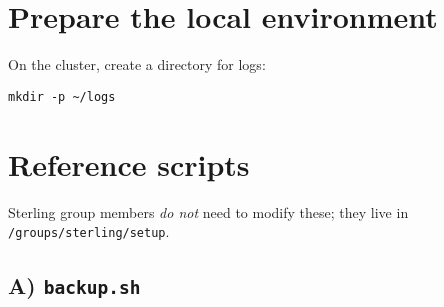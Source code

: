 \documentclass[12pt,letterpaper]{article}
\begin{document}
\section{Prepare the local environment}
\label{sec:prepare}
On the cluster, create a directory for logs:
\begin{lstlisting}[style=custombash]
mkdir -p ~/logs
\end{lstlisting}

\section{Reference scripts}
\label{sec:reference-scripts}
Sterling group members \emph{do not} need to modify these; they live in
\verb|/groups/sterling/setup|.

\subsection{A) \texttt{backup.sh}}
\end{document}
